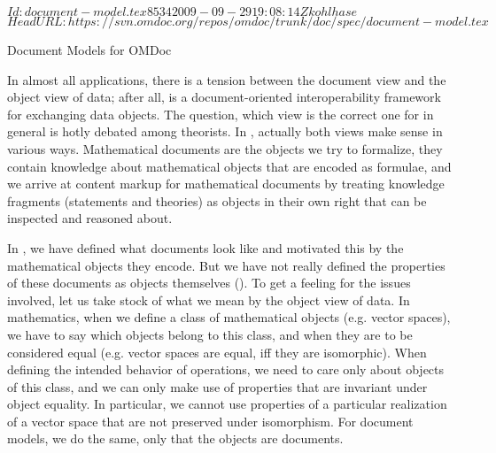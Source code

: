 \svnInfo $Id: document-model.tex 8534 2009-09-29 19:08:14Z kohlhase $
\svnKeyword $HeadURL: https://svn.omdoc.org/repos/omdoc/trunk/doc/spec/document-model.tex $

\begin{module}[id=document-model]
\begin{omgroup}[id=document-model]{Document Models for OMDoc}

In almost all {\xml} applications, there is a tension between the document view and the
object view of data; after all, {\xml} is a document-oriented interoperability framework
for exchanging data objects. The question, which view is the correct one for {\xml} in
general is hotly debated among {\xml} theorists. In {\omdoc}, actually both views make
sense in various ways. Mathematical documents are the objects we try to formalize, they
contain knowledge about mathematical objects that are encoded as formulae, and we arrive
at content markup for mathematical documents by treating knowledge fragments (statements
and theories) as objects in their own right that can be inspected and reasoned about.

In {}, we have defined what {\omdoc} documents look like and motivated
this by the mathematical objects they encode. But we have not really defined the
properties of these documents as objects themselves (). To get a feeling for
the issues involved, let us take stock of what we mean by the object view of data. In
mathematics, when we define a class of mathematical objects (e.g.  vector spaces), we have
to say which objects belong to this class, and when they are to be considered equal (e.g.
vector spaces are equal, iff they are isomorphic). When defining the intended behavior of
operations, we need to care only about objects of this class, and we can only make use of
properties that are invariant under object equality. In particular, we cannot use
properties of a particular realization of a vector space that are not preserved under
isomorphism. For document models, we do the same, only that the objects are documents.



\end{omgroup}
\end{module}

